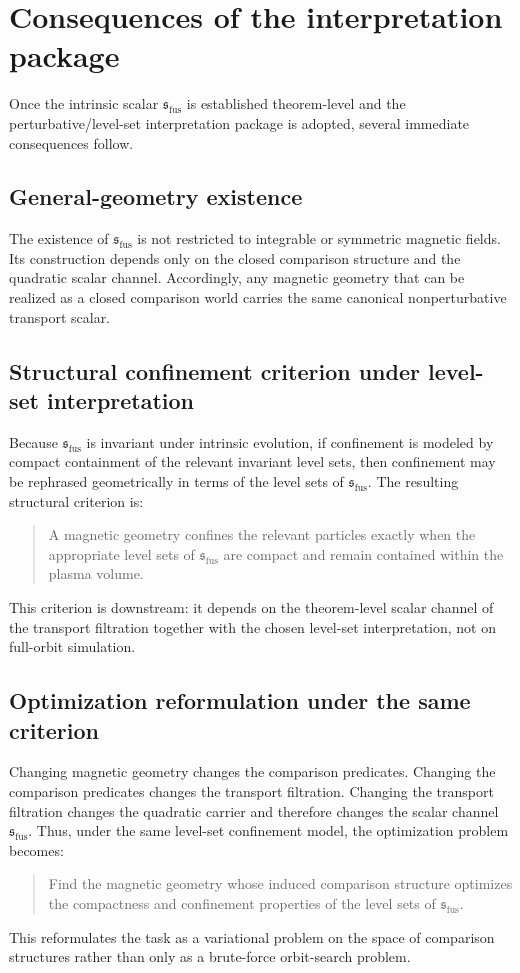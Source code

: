\section{Consequences of the interpretation package}
\label{sec:fusion-predictions}
Once the intrinsic scalar \(\mathfrak s_{\mathrm{fus}}\) is established theorem-level and the
perturbative/level-set interpretation package is adopted, several
immediate consequences follow.
\subsection{General-geometry existence}
The existence of \(\mathfrak s_{\mathrm{fus}}\) is not restricted to integrable or symmetric
magnetic fields.
Its construction depends only on the closed comparison structure and the
quadratic scalar channel.
Accordingly, any magnetic geometry that can be realized as a closed
comparison world carries the same canonical nonperturbative transport
scalar.
\subsection{Structural confinement criterion under level-set interpretation}
Because \(\mathfrak s_{\mathrm{fus}}\) is invariant under intrinsic evolution, if confinement is
modeled by compact containment of the relevant invariant level sets, then
confinement may be rephrased geometrically in terms of the level sets of
\(\mathfrak s_{\mathrm{fus}}\).
The resulting structural criterion is:
\begin{quote}
	A magnetic geometry confines the relevant particles exactly when the
	appropriate level sets of \(\mathfrak s_{\mathrm{fus}}\) are compact and remain contained within
	the plasma volume.
\end{quote}
This criterion is downstream: it depends on the theorem-level scalar
channel of the transport filtration together with the chosen level-set
interpretation, not on full-orbit simulation.
\subsection{Optimization reformulation under the same criterion}
Changing magnetic geometry changes the comparison predicates.
Changing the comparison predicates changes the transport filtration.
Changing the transport filtration changes the quadratic carrier and
therefore changes the scalar channel \(\mathfrak s_{\mathrm{fus}}\).
Thus, under the same level-set confinement model, the optimization
problem becomes:
\begin{quote}
	Find the magnetic geometry whose induced comparison structure optimizes
	the compactness and confinement properties of the level sets of \(\mathfrak s_{\mathrm{fus}}\).
\end{quote}
This reformulates the task as a variational problem on the space of
comparison structures rather than only as a brute-force orbit-search
problem.
